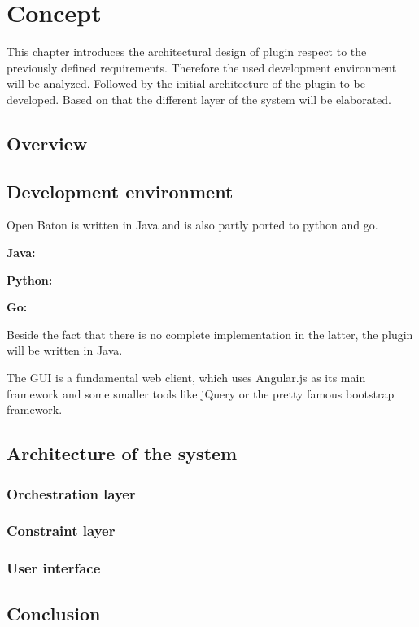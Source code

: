 \acresetall

\chapter{Concept}\label{chapter:concept}
This chapter introduces the architectural design of plugin respect to the previously defined requirements.
Therefore the used development environment will be analyzed.
Followed by the initial architecture of the plugin to be developed.
Based on that the different layer of the system will be elaborated.

\section{Overview}
\doit


\section{Development environment}
\doit

Open Baton is written in Java and is also partly ported to python and go.

\textbf{Java:}

\textbf{Python:}

\textbf{Go:}

Beside the fact that there is no complete implementation in the latter, the plugin will be written in Java.

The \ac{GUI} is a fundamental web client, which uses Angular.js as its main framework and some smaller tools like jQuery or the pretty famous bootstrap framework.



\section{Architecture of the system}
\doit


\subsection{Orchestration layer}
\doit

\subsection{Constraint layer}
\doit

\subsection{User interface}
\doit

\section{Conclusion}
\doit
